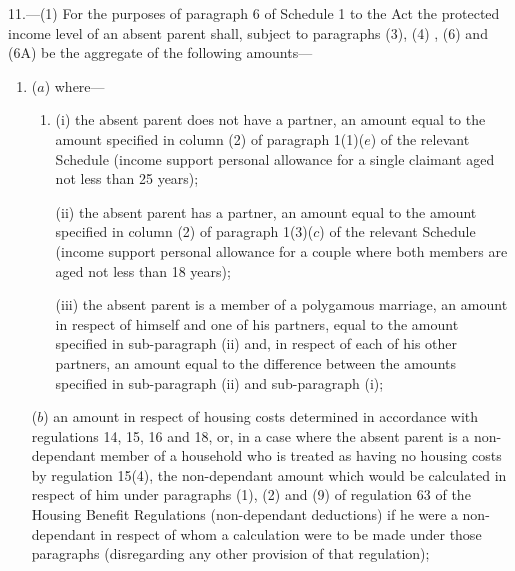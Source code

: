 \documentclass[a4paper]{article}
\begin{document}
11.—(1) For the purposes of paragraph 6 of Schedule 1 to the Act the protected income level of an absent parent shall, 
subject to paragraphs (3), (4)%
  , (6) and (6A)  %
be the aggregate of the following amounts—
\begin{enumerate}\item[]
($a$) where—
\begin{enumerate}\item[]
(i) the absent parent does not have a partner, an amount equal to the amount specified in column (2) of paragraph 1(1)($e$) of the relevant Schedule (income support personal allowance for a single claimant aged not less than 25 years);

(ii) the absent parent has a partner, an amount equal to the amount specified in column (2) of paragraph 1(3)($c$) of the relevant Schedule (income support personal allowance for a couple where both members are aged not less than 18 years);

(iii) the absent parent is a member of a polygamous marriage, an amount in respect of himself and one of his partners, equal to the amount specified in sub-paragraph (ii) and, in respect of each of his other partners, an amount equal to the difference between the amounts specified in sub-paragraph (ii) and sub-paragraph (i);
\end{enumerate}

($b$) an amount in respect of housing costs determined in accordance with regulations 14, 15, 16 and 18, or, in a case where the absent parent is a non-dependant member of a household who is treated as having no housing costs by 
regulation 15(4),  %
the non-dependant amount which would be calculated in respect of him under 
paragraphs (1), (2) and (9) of regulation 63 of the Housing Benefit Regulations (non-dependant deductions) if he were a non-dependant in respect of whom a calculation were to be made under those paragraphs (disregarding any other provision of that regulation);  %



\end{enumerate}
\end{document}
